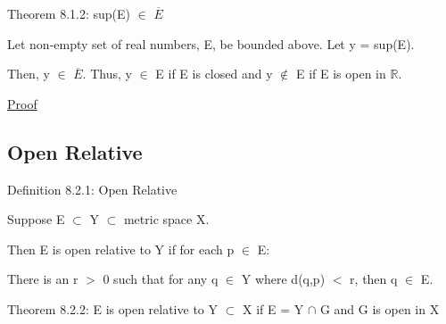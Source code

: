 	\vspace{0.5cm}

{ \color{red} Theorem 8.1.2: sup(E) $\in$ $\overline{E}$ }

    \begin{adjustbox}{minipage=14cm, right, vspace=0.1cm 0cm}
        Let non-empty set of real numbers, E, be bounded above.
        Let y = sup(E).
		
		Then, y $\in$ $\overline{E}$.
        Thus, y $\in$ E if E is closed
		and y $\not \in$ E if E is open in $\mathbb{R}$.
    \end{adjustbox}

{ \color{magenta} \underline{Proof} }






\subsection{ Open Relative }

{ \color{blue} Definition 8.2.1: Open Relative }

	\begin{adjustbox}{minipage=14cm, right, vspace=0.1cm 0cm}
		Suppose E $\subset$ Y $\subset$ metric space X.

		Then E is open relative to Y if for each p $\in$ E:
		
		\hspace{1cm}
		There is an r $>$ 0 such that for any q $\in$ Y where d(q,p) $<$ r,
		then q $\in$ E.
	\end{adjustbox}

\newpage

{ \color{red} Theorem 8.2.2: E is open relative to Y $\subset$ X
if E = Y $\cap$ G and G is open in X} 

